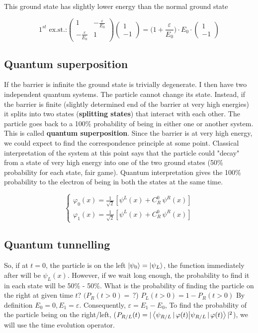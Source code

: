 This ground state has slightly lower energy than the normal ground state

$$1^{st}\text{ ex.st.:}\begin{pmatrix}1 & -\frac{\varepsilon}{E_0}\\-\frac{\varepsilon}{E_0} & 1\end{pmatrix}\begin{pmatrix}1\\-1\end{pmatrix}=\biggl(1+\frac{\varepsilon}{E_0}\biggr)\cdot E_0 \cdot\begin{pmatrix}1\\-1\end{pmatrix}$$

	\subsection{Quantum superposition}
If the barrier is infinite the ground state is trivially degenerate.
I then have two independent quantum systems.
The particle cannot change its state.
Instead, if the barrier is finite (slightly determined end of the barrier at very high energies) it splits into two states (\textbf{splitting states}) that interact with each other.
The particle goes back to a 100\% probability of being in either one or another system.
This is called \textbf{quantum superposition}.
Since the barrier is at very high energy, we could expect to find the correspondence principle at some point.
Classical interpretation of the system at this point says that the particle could "decay" from a state of very high energy into one of the two ground states (50\% probability for each state, fair game).
Quantum interpretation gives the 100\% probability to the electron of being in both the states at the same time.

$$\begin{cases}\varphi_0(x) = \frac{1}{\sqrt{2}}[\psi^L(x)+C_R^0\,\psi^R(x)]\\\varphi_1(x) = \frac{1}{\sqrt{2}}[\psi^L(x)+C_R^0\,\psi^R(x)]\end{cases}$$

	\subsection{Quantum tunnelling}
	So, if at $t=0$, the  particle is on the left $\ket{\psi_0}=\ket{\psi_L}$, the function immediately after will be $\psi_L(x)$.
	However, if we wait long enough, the probability to find it in each state will be 50\% - 50\%.
	What is the probability of finding the particle on the right at given time $t$? $(P_R(t>0)=\,?$) $P_L(t>0)=1-P_R(t>0)$
	By definition $E_0=0, E_1= \varepsilon$.
	Consequently, $\varepsilon = E_1-E_0$,
	To find the probability of the particle being on the right/left, ($P_{R/L}(t)=|\braket{\psi_{R/L}\,|\,\varphi(t)}|^2$), we will use the time evolution operator.

